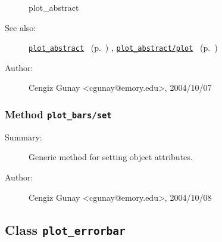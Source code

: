 \begin{description}
	plot\_abstract
%
%
\item[See also:]%
\hyperlink{ref_plot_abstract}{\texttt{plot\_abstract}}%
\ (p.~\pageref{ref_plot_abstract})%
%
, \hyperlink{ref_plot_abstract__plot}{\texttt{plot\_abstract/plot}}%
\ (p.~\pageref{ref_plot_abstract__plot})%
%
%
\item[Author:]%
Cengiz Gunay <cgunay@emory.edu>, 2004/10/07%
\end{description}
\methodline%
\subsubsection[Method \texttt{set}]{Method \texttt{plot\_bars/set}}%
%
\label{ref_plot_bars__set}%
\hypertarget{ref_plot_bars__set}{}%
\begin{description}
\item[Summary:]Generic method for setting object attributes.
%
%
%
%
%
%
%
\item[Author:]%
Cengiz Gunay <cgunay@emory.edu>, 2004/10/08%
\end{description}
\methodline%
\subsection{Class \texttt{plot\_errorbar}}%
%
\label{ref_plot_errorbar}%
\hypertarget{ref_plot_errorbar}{}%
